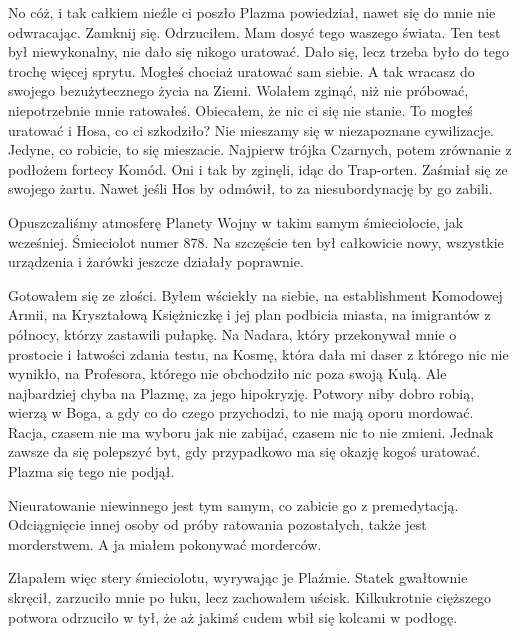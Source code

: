 \begin{dialogue}
\ds{} No cóż, i tak całkiem nieźle ci poszło \dm{} Plazma powiedział, nawet się do mnie nie odwracając. 
\ds{} Zamknij się. \dm{} Odrzuciłem. \dm{} Mam dosyć tego waszego świata. Ten test był niewykonalny, nie dało się nikogo uratować.
\ds{} Dało się, lecz trzeba było do tego trochę więcej sprytu. Mogłeś chociaż uratować sam siebie. A tak wracasz do swojego bezużytecznego życia na Ziemi.
\ds{} Wolałem zginąć, niż nie próbować, niepotrzebnie mnie ratowałeś.
\ds{} Obiecałem, że nic ci się nie stanie.
\ds{} To mogłeś uratować i Hosa, co ci szkodziło?
\ds{} Nie mieszamy się w niezapoznane cywilizacje.
\ds{} Jedyne, co robicie, to się mieszacie. Najpierw trójka Czarnych, potem zrównanie z podłożem fortecy Komód.
\ds{} Oni i tak by zginęli, idąc do Trap-orten. \dm{} Zaśmiał się ze swojego żartu. \dm{} Nawet jeśli Hos by odmówił, to za niesubordynację by go zabili.
\end{dialogue}

Opuszczaliśmy atmosferę Planety Wojny w takim samym śmieciolocie, jak wcześniej. Śmieciolot numer 878.
Na szczęście ten był całkowicie nowy, wszystkie urządzenia i żarówki jeszcze działały poprawnie.

Gotowałem się ze złości. Byłem wściekły na siebie, na establishment Komodowej Armii, na Kryształową Księżniczkę i jej plan podbicia miasta, na imigrantów z północy, którzy zastawili pułapkę.
Na Nadara, który przekonywał mnie o prostocie i łatwości zdania testu, na Kosmę, która dała mi daser z którego nic nie wynikło, na Profesora, którego nie obchodziło nic poza swoją Kulą.
Ale najbardziej chyba na Plazmę, za jego hipokryzję. 
Potwory niby dobro robią, wierzą w Boga, a gdy co do czego przychodzi, to nie mają oporu mordować.
Racja, czasem nie ma wyboru jak nie zabijać, czasem nic to nie zmieni. Jednak zawsze da się polepszyć byt, gdy przypadkowo ma się okazję kogoś uratować.
Plazma się tego nie podjął. 

Nieuratowanie niewinnego jest tym samym, co zabicie go z premedytacją.
Odciągnięcie innej osoby od próby ratowania pozostałych, także jest morderstwem.
A ja miałem pokonywać morderców.

Złapałem więc stery śmieciolotu, wyrywając je Plaźmie.
Statek gwałtownie skręcił, zarzuciło mnie po łuku, lecz zachowałem uścisk.
Kilkukrotnie cięższego potwora odrzuciło w tył, że aż jakimś cudem wbił się kolcami w podłogę.


